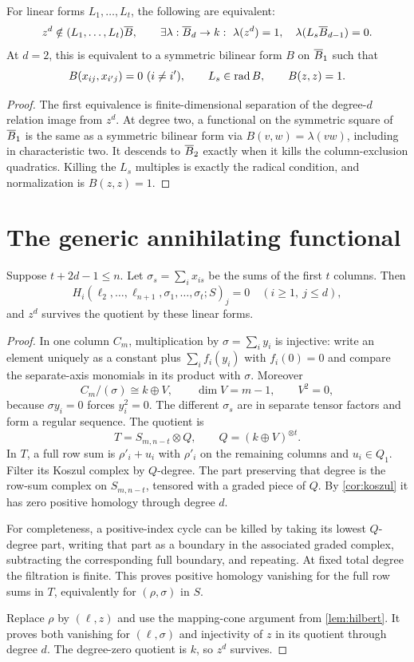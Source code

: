 \begin{lemma}\label{lem:affinefeasibility}
For linear forms $L_1,\ldots,L_t$, the following are equivalent:
\[
 z^d\notin(L_1,\ldots,L_t)\BB,\qquad
 \exists\lambda:\BB_d\to k:\ 
 \lambda(z^d)=1,\quad \lambda(L_s\BB_{d-1})=0.
\]
At $d=2$, this is equivalent to a symmetric bilinear form $B$ on $\overline B_1$ such that
\[
 B(x_{ij},x_{i'j})=0\ (i\ne i'),\qquad
 L_s\in\operatorname{rad} B,\qquad B(z,z)=1.
\]
\end{lemma}
\begin{proof}
The first equivalence is finite-dimensional separation of the degree-$d$ relation image from $z^d$. At degree two, a functional on the symmetric square of $\overline B_1$ is the same as a symmetric bilinear form via $B(v,w)=\lambda(vw)$, including in characteristic two. It descends to $\overline B_2$ exactly when it kills the column-exclusion quadratics. Killing the $L_s$ multiples is exactly the radical condition, and normalization is $B(z,z)=1$.
\end{proof}

\section{The generic annihilating functional}
\begin{lemma}\label{lem:special-columns}
Suppose $t+2d-1\le n$. Let $\sigma_s=\sum_i x_{is}$ be the sums of the first $t$ columns. Then
\[
 H_i(\ell_2,\ldots,\ell_{n+1},\sigma_1,\ldots,\sigma_t;S)_j=0
 \quad(i\ge1,\ j\le d),
\]
and $z^d$ survives the quotient by these linear forms.
\end{lemma}
\begin{proof}
In one column $C_m$, multiplication by $\sigma=\sum_i y_i$ is injective: write an element uniquely as a constant plus $\sum_i f_i(y_i)$ with $f_i(0)=0$ and compare the separate-axis monomials in its product with $\sigma$. Moreover
\[
 C_m/(\sigma)\cong k\oplus V,\qquad \dim V=m-1,\qquad V^2=0,
\]
because $\sigma y_i=0$ forces $y_i^2=0$. The different $\sigma_s$ are in separate tensor factors and form a regular sequence. The quotient is
\[
 T=S_{m,n-t}\otimes Q,\qquad Q=(k\oplus V)^{\otimes t}.
\]
In $T$, a full row sum is $\rho'_i+u_i$ with $\rho'_i$ on the remaining columns and $u_i\in Q_1$. Filter its Koszul complex by $Q$-degree. The part preserving that degree is the row-sum complex on $S_{m,n-t}$, tensored with a graded piece of $Q$. By \cref{cor:koszul} it has zero positive homology through degree $d$.

For completeness, a positive-index cycle can be killed by taking its lowest $Q$-degree part, writing that part as a boundary in the associated graded complex, subtracting the corresponding full boundary, and repeating. At fixed total degree the filtration is finite. This proves positive homology vanishing for the full row sums in $T$, equivalently for $(\rho,\sigma)$ in $S$.

Replace $\rho$ by $(\ell,z)$ and use the mapping-cone argument from \cref{lem:hilbert}. It proves both vanishing for $(\ell,\sigma)$ and injectivity of $z$ in its quotient through degree $d$. The degree-zero quotient is $k$, so $z^d$ survives.
\end{proof}

